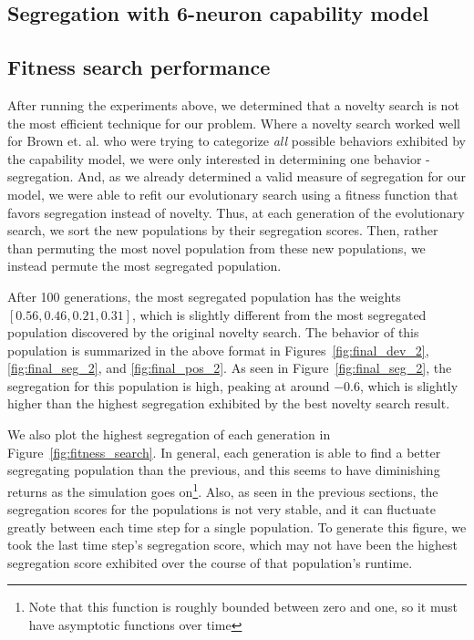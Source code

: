 \subsection{Segregation with 6-neuron capability model}
\label{sec:seg6}



\subsection{Fitness search performance}
\label{sec:fitness}

After running the experiments above, we determined that a novelty search is not the most efficient technique for our problem. 
Where a novelty search worked well for Brown et. al. who were trying to categorize \emph{all} possible behaviors exhibited by the capability model, we were only interested in determining one behavior - segregation.
And, as we already determined a valid measure of segregation for our model, we were able to refit our evolutionary search using a fitness function that favors segregation instead of novelty. 
Thus, at each generation of the evolutionary search, we sort the new populations by their segregation scores. 
Then, rather than permuting the most novel population from these new populations, we instead permute the most segregated population.

After 100 generations, the most segregated population has the weights $[0.56, 0.46, 0.21, 0.31]$, which is slightly different from the most segregated population discovered by the original novelty search. 
The behavior of this population is summarized in the above format in Figures~\ref{fig:final_dev_2}, \ref{fig:final_seg_2}, and \ref{fig:final_pos_2}. 
As seen in Figure~\ref{fig:final_seg_2}, the segregation for this population is high, peaking at around $-0.6$, which is slightly higher than the highest segregation exhibited by the best novelty search result. 

We also plot the highest segregation of each generation in Figure~\ref{fig:fitness_search}. 
In general, each generation is able to find a better segregating population than the previous, and this seems to have diminishing returns as the simulation goes on\footnote{Note that this function is roughly bounded between zero and one, so it must have asymptotic functions over time}. 
Also, as seen in the previous sections, the segregation scores for the populations is not very stable, and it can fluctuate greatly between each time step for a single population. 
To generate this figure, we took the last time step's segregation score, which may not have been the highest segregation score exhibited over the course of that population's runtime. 

